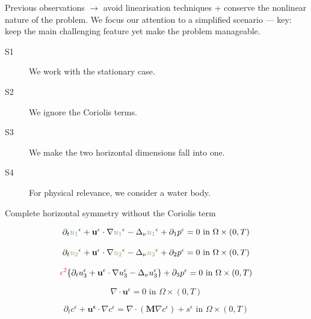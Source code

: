 \documentclass{beamer}
\begin{document}
\begin{frame}
Previous observations $\to$ \textcolor{mediumred-violet}{avoid linearisation techniques} + conserve the nonlinear nature of the problem. We focus our attention to a simplified scenario --- key: keep the main challenging feature yet make the problem manageable.

\begin{description}
\item[S1] We work with the stationary case.
\item[S2] We ignore the Coriolis terms.
\item[S3] We make the two horizontal dimensions fall into one.
\item[S4] For physical relevance, we consider a water body.
\end{description}

\end{frame}

\begin{frame}{Complete horizontal symmetry without the Coriolis term}

$$ \partial_t \textcolor{airforceblue}{u_1}^\epsilon + \mathbf{u}^\epsilon \cdot \nabla \textcolor{airforceblue}{u_1}^\epsilon -\Delta_\nu \textcolor{airforceblue}{u_1}^\epsilon + \partial_1 p^\epsilon = 0 \text{ in } \Omega \times (0,T) $$

$$ \partial_t \textcolor{asparagus}{u_2}^\epsilon + \mathbf{u}^\epsilon \cdot \nabla \textcolor{asparagus}{u_2}^\epsilon -\Delta_\nu \textcolor{asparagus}{u_2}^\epsilon + \partial_2 p^\epsilon = 0 \text{ in } \Omega \times (0,T) $$

$$ \textcolor{jasper}{\epsilon^2} \{  \partial_t u_3^\epsilon + \mathbf{u}^\epsilon \cdot \nabla u_3^\epsilon -\Delta_\nu u_3^{\epsilon} \} + \partial_3 p^\epsilon = 0 \text{ in } \Omega \times (0,T) $$

$$ \nabla \cdot \mathbf{u}^\epsilon= 0 \text{ in } \Omega \times (0,T) $$

$$ \partial_t c^\epsilon + \mathbf{u^\epsilon} \cdot \nabla c^\epsilon = \nabla \cdot (\mathbf{M} \nabla c^\epsilon) + s^\epsilon \text{ in } \Omega \times (0,T) $$

\end{frame}
\end{document}
